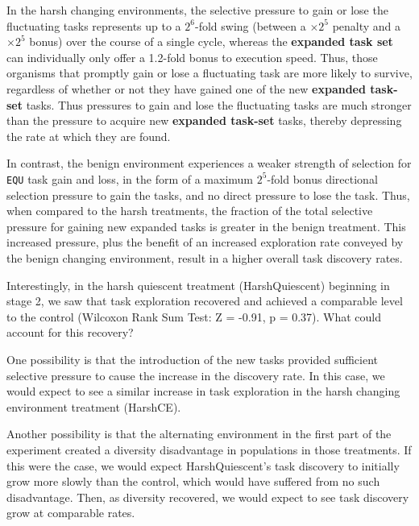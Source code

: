 \documentclass[10pt,letterpaper,final]{article}
\begin{document}
In the harsh changing environments, the selective pressure to gain or lose the fluctuating tasks represents up to a $2^6$-fold swing (between a $\times 2^5$ penalty and a $\times 2^5$ bonus) over the course of a single cycle, whereas the \textbf{expanded task set} can individually only offer a 1.2-fold bonus to execution speed. Thus, those organisms that promptly gain or lose a fluctuating task are more likely to survive, regardless of whether or not they have gained one of the new \textbf{expanded task-set} tasks. Thus pressures to gain and lose the fluctuating tasks are much stronger than the pressure to acquire new \textbf{expanded task-set} tasks, thereby depressing the rate at which they are found.

In contrast, the benign environment experiences a weaker strength of selection for \texttt{EQU} task gain and loss, in the form of a maximum $2^5$-fold bonus directional selection pressure to gain the tasks, and no direct pressure to lose the task. Thus, when compared to the harsh treatments, the fraction of the total selective pressure for gaining new expanded tasks is greater in the benign treatment. This increased pressure, plus the benefit of an increased exploration rate conveyed by the benign changing environment, result in a higher overall task discovery rates.

Interestingly, in the harsh quiescent treatment (HarshQuiescent) beginning in stage 2, we saw that task exploration recovered and achieved a comparable level to the control (Wilcoxon Rank Sum Test: Z = -0.91, p = 0.37). What could account for this recovery? 

One possibility is that the introduction of the new tasks provided sufficient selective pressure to cause the increase in the discovery rate. In this case, we would expect to see a similar increase in task exploration in the harsh changing environment treatment (HarshCE). 

Another possibility is that the alternating environment in the first part of the experiment created a diversity disadvantage in populations in those treatments. If this were the case, we would expect HarshQuiescent's task discovery to initially grow more slowly than the control, which would have suffered from no such disadvantage. Then, as diversity recovered, we would expect to see task discovery grow at comparable rates.
\end{document}
